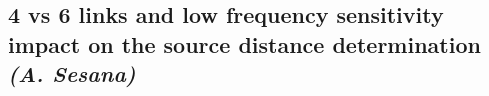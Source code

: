 \documentclass{iopart}
\begin{document}








\subsection{4 vs 6 links and low frequency sensitivity impact on the source distance determination {\it (A. Sesana)} }
\label{SS:SMBH4vs6link}
\end{document}
